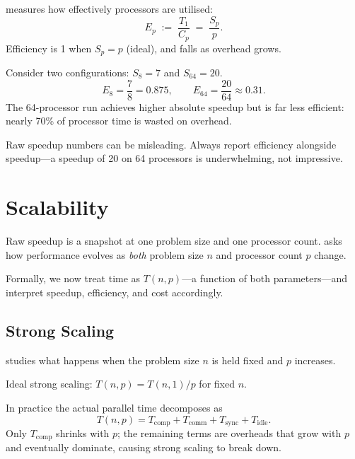 \begin{ppdefn}
 measures how effectively processors are utilised:
\[
  E_p \;:=\; \frac{T_1}{C_p} \;=\; \frac{S_p}{p}.
\]
Efficiency is 1 when $S_p = p$ (ideal), and falls as overhead grows.
\end{ppdefn}

\begin{ppexample}
Consider two configurations: $S_8 = 7$ and $S_{64} = 20$.
\[
  E_8 = \frac{7}{8} = 0.875, \qquad E_{64} = \frac{20}{64} \approx 0.31.
\]
The 64-processor run achieves higher absolute speedup but is far less efficient:
nearly 70\% of processor time is wasted on overhead.
\end{ppexample}

\begin{pppitfall}
Raw speedup numbers can be misleading. Always report efficiency alongside
speedup---a speedup of 20 on 64 processors is underwhelming, not impressive.
\end{pppitfall}

\section{Scalability}

Raw speedup is a snapshot at one problem size and one processor count.
 asks how performance evolves as \emph{both} problem
size $n$ and processor count $p$ change.

Formally, we now treat time as $T(n, p)$---a function of both parameters---and
interpret speedup, efficiency, and cost accordingly.

\subsection{Strong Scaling}

 studies what happens when the problem size $n$ is
held fixed and $p$ increases.

\begin{ppdefn}
Ideal strong scaling: $T(n, p) = T(n, 1)/p$ for fixed $n$.
\end{ppdefn}

In practice the actual parallel time decomposes as
\[
  T(n, p) = T_{\text{comp}} + T_{\text{comm}} + T_{\text{sync}} + T_{\text{idle}}.
\]
Only $T_{\text{comp}}$ shrinks with $p$; the remaining terms are overheads that
grow with $p$ and eventually dominate, causing strong scaling to break down.


